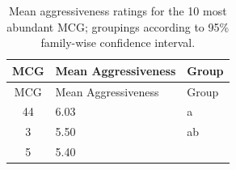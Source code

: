\documentclass[fleqn,10pt,lineno]{wlpeerj} %
\theoremstyle{definition}
\theoremstyle{definition}
\theoremstyle{definition}
\theoremstyle{remark}
\begin{document}
\begin{longtable}[]{@{}cll@{}}
\caption{\label{tab:MCG-aggressiveness} Mean aggressiveness ratings for the
10 most abundant MCG; groupings according to 95\% family-wise confidence
interval.}\tabularnewline
\toprule
\begin{minipage}[b]{0.10\columnwidth}\centering\strut
MCG\strut
\end{minipage} & \begin{minipage}[b]{0.25\columnwidth}\raggedright\strut
Mean Aggressiveness\strut
\end{minipage} & \begin{minipage}[b]{0.08\columnwidth}\raggedright\strut
Group\strut
\end{minipage}\tabularnewline
\midrule
\endfirsthead
\toprule
\begin{minipage}[b]{0.10\columnwidth}\centering\strut
MCG\strut
\end{minipage} & \begin{minipage}[b]{0.25\columnwidth}\raggedright\strut
Mean Aggressiveness\strut
\end{minipage} & \begin{minipage}[b]{0.08\columnwidth}\raggedright\strut
Group\strut
\end{minipage}\tabularnewline
\midrule
\endhead
\begin{minipage}[t]{0.10\columnwidth}\centering\strut
44\strut
\end{minipage} & \begin{minipage}[t]{0.25\columnwidth}\raggedright\strut
6.03\strut
\end{minipage} & \begin{minipage}[t]{0.08\columnwidth}\raggedright\strut
a\strut
\end{minipage}\tabularnewline
\begin{minipage}[t]{0.10\columnwidth}\centering\strut
3\strut
\end{minipage} & \begin{minipage}[t]{0.25\columnwidth}\raggedright\strut
5.50\strut
\end{minipage} & \begin{minipage}[t]{0.08\columnwidth}\raggedright\strut
ab\strut
\end{minipage}\tabularnewline
\begin{minipage}[t]{0.10\columnwidth}\centering\strut
5\strut
\end{minipage} & \begin{minipage}[t]{0.25\columnwidth}\raggedright\strut
5.40\strut

\end{minipage}
\end{longtable}
\end{document}
